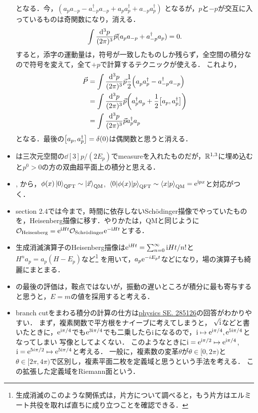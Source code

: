 \begin{itemize}
		となる．今，$(a_pa_{-p}-a_{-p}^\dag a_{-p}+a_pa_p^{\dag}+a_{-p}a_{p}^\dag)$
		となるが，$p$と$-p$が交互に入っているものは奇関数になり，消える．		\begin{equation}
			\int \frac{\dd[3]{p}}{(2\pi)^{3}}\vec{p}(a_pa_{-p}+a_{-p}^{\dag}a_{p}) = 0.
		\end{equation}
		すると，添字の運動量は，符号が一致したものしか残らず，全空間の積分なので符号を変えて，全て$+p$で計算するテクニックが使える．
		これより，
		\begin{align}
			\vec{P} &= \int \frac{\dd[3]{p}}{(2\pi)^{3}}\vec{p}\frac{1}{2}\qty(a_p^{}a_p^{\dag}-a_{-p}^\dag a_{-p}^{})\\
					&= \int \frac{\dd[3]{p}}{(2\pi)^{3}}\vec{p}\qty(a_p^{\dag}a_{p}^{}+\frac{1}{2}\qty[a_{p}{}, a_{p}^{\dag}])\\
					&= \int \frac{\dd[3]{p}}{(2\pi)^{3}}\vec{p}a_p^\dag a_p^{}
		\end{align}
		となる．最後の$\qty[a_{p}{}, a_{p}^{\dag}]= \delta(0)$は偶関数と思うと消える．
	\item {}は三次元空間の$\dd[3]p/(2E_p)$でmeasureを入れたものだが，$\mathbb{R}^{1,3}$に埋め込むと$p^0>0$の方の双曲超平面上の積分と思える．
	\item {}, から，$\phi(x)\ket{0}_{\text{QFT}}\sim\ket{\vec{x}}_{\text{QM}}$, $\mel{0}{\phi(x)}{p}_{\text{QFT}}\sim\braket{x}{p}_{\text{QM}}=\mathrm{e}^{\mathrm{i} px}$と対応がつく．
	\item section 2.4では今まで，時間に依存しないSch\"{o}dinger描像でやっていたものを，Heisenberg描像に移す．やりかたは，QMと同じように$\mathcal{O}_{\text{Heisenberg}} = \mathrm{e}^{\mathrm{i} Ht}\mathcal{O}_{\text{Schr\"{o}dinger}}\mathrm{e}^{-\mathrm{i} Ht}$とする．
	\item 生成消滅演算子のHeisenberg描像は$\mathrm{e}^{\mathrm{i} Ht} = \sum_{n=0}^{\infty}\mathrm{i} Ht/n!$と$H^na_p=a_p(H-E_p)$など\footnote{生成消滅のこのような関係式は，片方について調べると，もう片方はエルミート共役を取れば直ちに成り立つことを確認できる．}
		を用いて，$a_p\mathrm{e}^{-iE_pt}$などになり，場の演算子も綺麗にまとまる．
	\item {}の最後の評価は，鞍点ではないが，振動の遅いところが積分に最も寄与すると思うと，$E=m$の値を採用すると考える．
	\item branch cutをまわる積分の計算の仕方は\href{https://physics.stackexchange.com/questions/285126/an-integral-in-peskins-quantum-field-theory-p-27}{physics SE. 285126}の回答がわかりやすい．
		まず，複素関数で平方根をナイーブに考えてしまうと，
		$\sqrt{\mathrm{i}}$などと書いたときに，$\mathrm{e}^{\mathrm{i}\pi/4}$でも$\mathrm{e}^{3\mathrm{i}\pi/4}$でも二乗したら$\mathrm{i}$になるので，$\mathrm{i}\mapsto\mathrm{e}^{\mathrm{i}\pi/4}, \mathrm{e}^{5\mathrm{i}\pi/4}$となってしまい
		写像としてよくない．
		このようなときに$\mathrm{i}=\mathrm{e}^{\mathrm{i}\pi/2}\mapsto\mathrm{e}^{\mathrm{i}\pi/4}$, $\mathrm{i}=\mathrm{e}^{5i\pi/2}\mapsto \mathrm{e}^{5\mathrm{i}\pi/4}$と考える．
		一般に，複素数の変革$\theta$が$\theta\in[0, 2\pi)$と$\theta\in[2\pi, 4\pi)$で区別し，複素平面二枚を定義域と思うという手法を考える．
		この拡張した定義域をRiemann面という．


\end{itemize}
